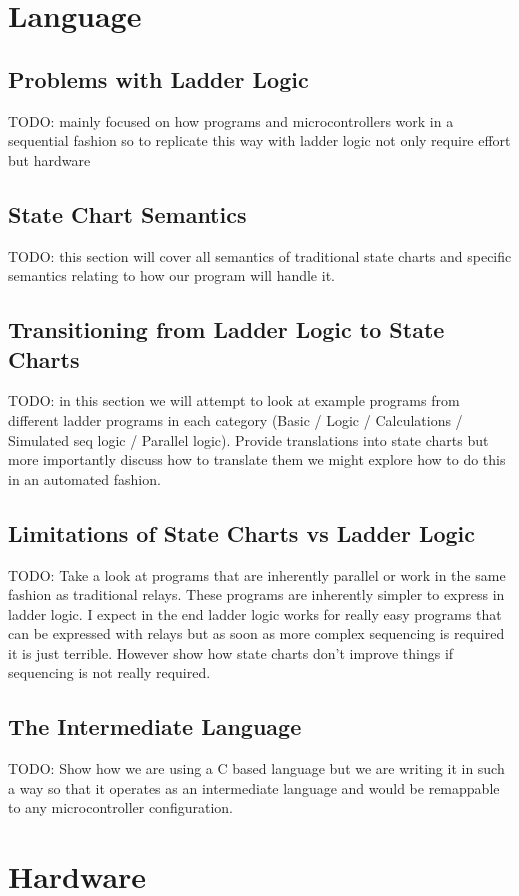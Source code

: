 \documentclass[final,12pt,twoside]{mcthesis}
\begin{document}
\chapter{Language}
\section{Problems with Ladder Logic}
TODO: mainly focused on how programs and microcontrollers work in a sequential fashion so to replicate this way with ladder logic not only require effort but hardware
\section{State Chart Semantics}
TODO: this section will cover all semantics of traditional state charts and specific semantics relating to how our program will handle it.
\section{Transitioning from Ladder Logic to State Charts}
TODO: in this section we will attempt to look at example programs from different ladder programs in each category (Basic / Logic / Calculations / Simulated seq logic / Parallel logic). Provide translations into state charts but more importantly discuss how to translate them we might explore how to do this in an automated fashion.
\section{Limitations of State Charts vs Ladder Logic}
TODO: Take a look at programs that are inherently parallel or work in the same fashion as traditional relays. These programs are inherently simpler to express in ladder logic. I expect in the end ladder logic works for really easy programs that can be expressed with relays but as soon as more complex sequencing is required it is just terrible. However show how state charts don't improve things if sequencing is not really required.
\section{The Intermediate Language}
TODO: Show how we are using a C based language but we are writing it in such a way so that it operates as an intermediate language and would be remappable to any microcontroller configuration.

\chapter{Hardware}
\end{document}
